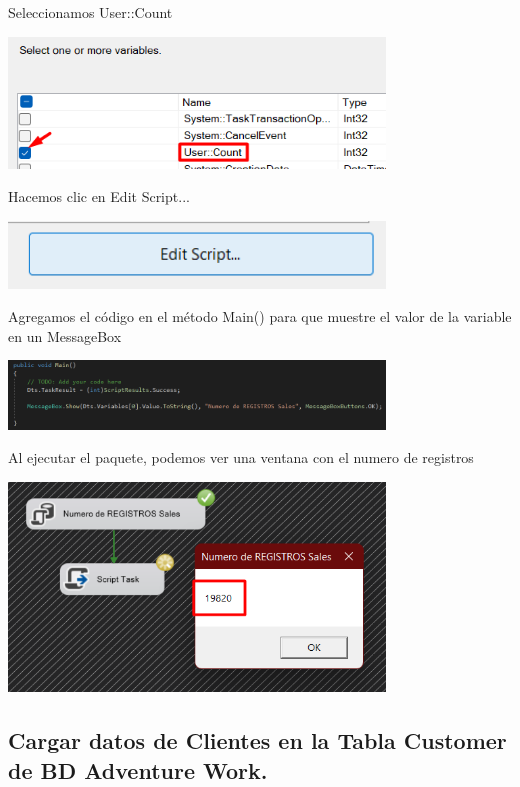 \documentclass[12pt,letterpaper]{article}
\begin{document}
Seleccionamos User::Count

\begin{center}
    \includegraphics[width=10cm]{./img/img27.png}
\end{center}

Hacemos clic en Edit Script...

\begin{center}
    \includegraphics[width=10cm]{./img/img28.png}
\end{center}

Agregamos el código en el método Main() para que muestre el valor de la variable en un MessageBox

\begin{center}
    \includegraphics[width=10cm]{./img/img29.png}
\end{center}

Al ejecutar el paquete, podemos ver una ventana con el numero de registros

\begin{center}
    \includegraphics[width=10cm]{./img/img30.png}
\end{center}

\subsection{Cargar datos de Clientes en la Tabla Customer de BD Adventure Work.}
\end{document}
